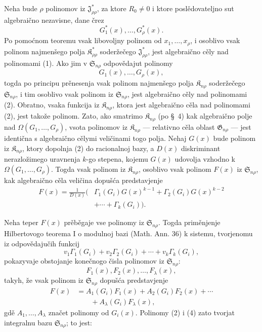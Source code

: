 \documentclass[11pt]{article}
\providecommand{\Kfield}{\mathfrak{K}}
\providecommand{\Ssys}{\mathfrak{S}}
\providecommand{\Jdom}{\mathfrak{J}}
\providecommand{\Gdom}{\mathfrak{G}}
\begin{document}
Neha bude $\rho$ polinomov iz $\Jdom^*_{\rho\rho}$, za ktore $R_0\ne0$ i ktore poslědovateljno sut algebraično nezavisne, dane črez
\begin{equation}
  G_1^*(x),\ldots,G_\rho^*(x).
\tag{1}
\end{equation}
Po pomoćnom teoremu vsak libovoljny polinom od $x_1,\ldots,x_\rho$, i osoblivo vsak polinom najmenšego polja $\Kfield^*_{\rho\rho}$ soderžečego $\Jdom^*_{\rho\rho}$, jest algebraično cěly nad polinomami (1). Ako jim v $\Ssys_{n\rho}$ odpovědajut polinomy
\begin{equation}
  G_1(x),\ldots,G_\rho(x),
\tag{2}
\end{equation}
togda po principu prěnesenja vsak polinom najmenšego polja $\Kfield_{n\rho}$ soderžečego $\Ssys_{n\rho}$, i tim osoblivo vsak polinom iz $\Ssys_{n\rho}$, jest algebraično cěly nad polinomami (2). Obratno, vsaka funkcija iz $\Kfield_{n\rho}$, ktora jest algebraično cěla nad polinomami (2), jest takože polinom. Zato, ako smatrimo $\Kfield_{n\rho}$ (po \S\ 4) kak algebraično polje nad $\Omega(G_1,\ldots,G_\rho)$, vsota polinomov iz $\Kfield_{n\rho}$ --- relativno cěla oblast $\Gdom_{n\rho}$ --- jest identična s algebraično cělymi veličinami togo polja. Nehaj $G(x)$ bude polinom iz $\Kfield_{n\rho}$, ktory dopolnja (2) do racionalnoj bazy, a $D(x)$ diskriminant nerazložimego uravnenja $k$-go stepena, kojemu $G(x)$ udovolja vzhodno k $\Omega(G_1,\ldots,G_\rho)$. Togda vsak polinom iz $\Kfield_{n\rho}$, osoblivo vsak polinom $F(x)$ iz $\Ssys_{n\rho}$, kak algebraično cěla veličina dopušća predstavjenje
\begin{equation}
\begin{split}
  F(x)=\frac{1}{D(x)}\big(&\Gamma_1(G_i)G(x)^{k-1}
    +\Gamma_2(G_i)G(x)^{k-2}\\
    &+\cdots+\Gamma_k(G_i)\big).
\end{split}
\tag{3}
\end{equation}

Neha teper $F(x)$ prěběgaje vse polinomy iz $\Ssys_{n\rho}$. Togda priměnjenje Hilbertovogo teorema I o modulnoj bazi (Math. Ann. 36) k sistemu, tvorjenomu iz odpovědajučih funkcij
\[
  v_1\Gamma_1(G_i)+v_2\Gamma_2(G_i)+\cdots+v_k\Gamma_k(G_i),
\]
pokazyvaje obstojanje konečnogo čisla polinomov iz $\Ssys_{n\rho}$:
\begin{equation}
  F_1(x),F_2(x),\ldots,F_\lambda(x),
\tag{4}
\end{equation}
takyh, že vsak polinom iz $\Ssys_{n\rho}$ dopušća predstavjenje
\begin{equation}
\begin{aligned}
  F(x)&=A_1(G_i)F_1(x)+A_2(G_i)F_2(x)+\cdots\\
      &\qquad +A_\lambda(G_i)F_\lambda(x),
\end{aligned}
\tag{5}
\end{equation}
gdě $A_1,\ldots,A_\lambda$ značet polinomy od $G_i(x)$. Polinomy (2) i (4) zato tvorjat integralnu bazu $\Ssys_{n\rho}$; to jest:
\end{document}
